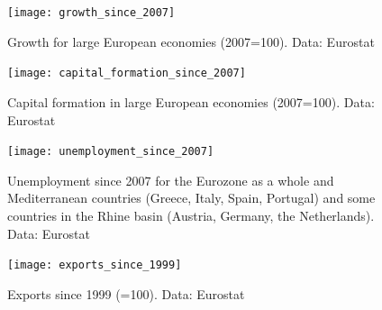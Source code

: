 \documentclass{tufte-handout}
\begin{document}
\begin{figure}
  \texttt{[image: growth\_since\_2007]}
  \caption{Growth for large European economies (2007=100). Data: Eurostat}
  \label{fig:growth_2007}
\end{figure}

\begin{figure}
  \texttt{[image: capital\_formation\_since\_2007]}
  \caption{Capital formation in large European economies (2007=100). Data: Eurostat}
  \label{fig:capital_2007}
\end{figure}

\clearpage

\begin{figure}
  \texttt{[image: unemployment\_since\_2007]}
  \caption{Unemployment since 2007 for the Eurozone as a whole and Mediterranean countries (Greece, Italy, Spain, Portugal) and some countries in the Rhine basin (Austria, Germany, the Netherlands). Data: Eurostat}
  \label{fig:unemployment_2007}
\end{figure}
\begin{figure}
  \texttt{[image: exports\_since\_1999]}
  \caption{Exports since 1999 (=100). Data: Eurostat}
  \label{fig:exports_1999}
\end{figure}

\clearpage
\end{document}
